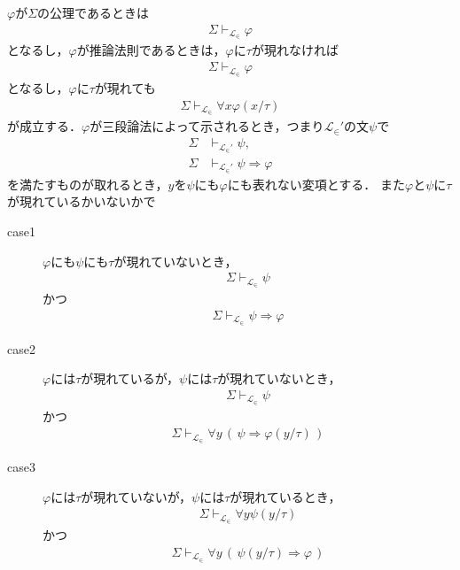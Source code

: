 	\begin{sketch}
		$\varphi$が$\Sigma$の公理であるときは
		\begin{align}
			\Sigma \vdash_{\mathcal{L}_{\in}} \varphi
		\end{align}
		となるし，$\varphi$が推論法則であるときは，$\varphi$に$\tau$が現れなければ
		\begin{align}
			\Sigma \vdash_{\mathcal{L}_{\in}} \varphi
		\end{align}
		となるし，$\varphi$に$\tau$が現れても
		\begin{align}
			\Sigma \vdash_{\mathcal{L}_{\in}} \forall x \varphi(x/\tau)
		\end{align}
		が成立する．$\varphi$が三段論法によって示されるとき，つまり$\mathcal{L}_{\in}'$の文$\psi$で
		\begin{align}
			\Sigma &\vdash_{\mathcal{L}_{\in}'} \psi, \\
			\Sigma &\vdash_{\mathcal{L}_{\in}'} \psi \Longrightarrow \varphi
		\end{align}
		を満たすものが取れるとき，$y$を$\psi$にも$\varphi$にも表れない変項とする．
		また$\varphi$と$\psi$に$\tau$が現れているかいないかで
		\begin{description}
			\item[case1] $\varphi$にも$\psi$にも$\tau$が現れていないとき，
				\begin{align}
					\Sigma \vdash_{\mathcal{L}_{\in}} \psi
				\end{align}
				かつ
				\begin{align}
					\Sigma \vdash_{\mathcal{L}_{\in}} \psi \Longrightarrow \varphi
				\end{align}
				
			\item[case2] $\varphi$には$\tau$が現れているが，$\psi$には$\tau$が現れていないとき，
				\begin{align}
					\Sigma \vdash_{\mathcal{L}_{\in}} \psi
				\end{align}
				かつ
				\begin{align}
					\Sigma \vdash_{\mathcal{L}_{\in}} 
					\forall y\, (\, \psi \Longrightarrow \varphi(y/\tau)\, )
				\end{align}
				
			\item[case3] $\varphi$には$\tau$が現れていないが，$\psi$には$\tau$が現れているとき，
				\begin{align}
					\Sigma \vdash_{\mathcal{L}_{\in}} \forall y \psi(y/\tau)
				\end{align}
				かつ
				\begin{align}
					\Sigma \vdash_{\mathcal{L}_{\in}} 
					\forall y\, (\, \psi(y/\tau) \Longrightarrow \varphi\, )
				\end{align}
				

\end{description}
\end{sketch}

